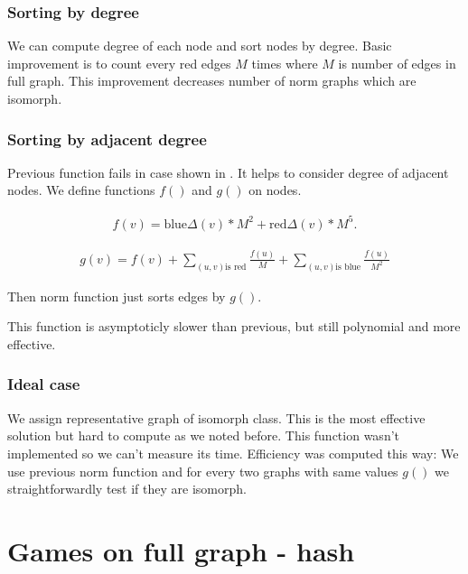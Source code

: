 \subsubsection{Sorting by degree}
We can compute degree of each node and sort nodes by degree. Basic improvement
is to count every red edges $M$ times where $M$ is number of edges in full
graph. This improvement decreases number of norm graphs which are isomorph.

\subsubsection{Sorting by adjacent degree} \label{norm2}

 Previous function fails in case shown
in . It helps to consider
degree of adjacent nodes. We define functions $f()$ and $g()$ on nodes. 

\begin{eqnarray*} 
f(v) = \mbox{blue}\Delta (v) * M^2 + \mbox{red}\Delta (v) * M^5.
\end{eqnarray*}

\begin{eqnarray*} 
g(v) = f(v) + \sum_{(u,v) \mbox{is red}}{\frac{f(u)}{M}} + \sum_{(u,v) \mbox{is blue}}{\frac{f(u)}{M^2}}
\end{eqnarray*}

Then norm function just sorts edges by $g()$.

This function is asymptoticly slower than previous, but still polynomial
and more effective.

\subsubsection{Ideal case} 
We assign representative graph of isomorph class.
This is the most effective solution but hard to compute as we noted before.
This function wasn't implemented so we can't measure its time.
Efficiency was computed this way: We use previous norm function
and for every two graphs with same values $g()$ we straightforwardly test 
if they are isomorph. 

\section{ Games on full graph - hash } 




